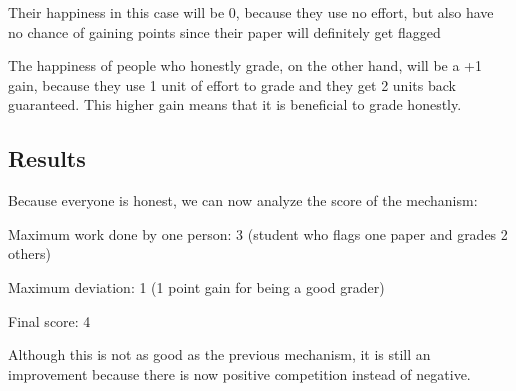 \documentclass[12pt, Arial]{article}
\begin{document}
Their happiness in this case will be 0, because they use no effort, but also have no chance of gaining points since their paper will definitely get flagged

The happiness of people who honestly grade, on the other hand, will be a +1 gain, because they use 1 unit of effort to grade and they get 2 units back guaranteed. This higher gain means that it is beneficial to grade honestly.

\subsection{Results}
Because everyone is honest, we can now analyze the score of the mechanism:

Maximum work done by one person: 3 (student who flags one paper and grades 2 others)

Maximum deviation: 1 (1 point gain for being a good grader)

Final score: 4

Although this is not as good as the previous mechanism, it is still an improvement because there is now positive competition instead of negative.
\end{document}
